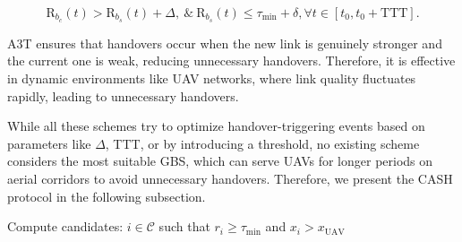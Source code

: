 \documentclass[10pt,conference]{IEEEtran}
\begin{document}
\begin{equation}
\label{a3teq}
\text{R}_{b_c}(t) > \text{R}_{b_s}(t) + \Delta, \: \text{\&} \: \text{R}_{b_s}(t) \leq \tau_{\min} + \delta,  \forall t \in [t_0, t_0 + \mathrm{TTT}].
\end{equation}

A3T ensures that handovers occur when the new link is genuinely stronger and the current one is weak, reducing unnecessary handovers. Therefore, it is effective in dynamic environments like UAV networks, where link quality fluctuates rapidly, leading to unnecessary handovers.

While all these schemes try to optimize handover-triggering events based on parameters like $\Delta$, TTT, or by introducing a threshold, no existing scheme considers the most suitable GBS, which can serve UAVs for longer periods on aerial corridors to avoid unnecessary handovers. Therefore, we present the CASH protocol in the following subsection.   



\begin{algorithm}[!t]
\small
\caption{CASH: Context-Aware Smart Handover}


Compute candidates: $i \in \mathcal{C}$ such that $r_i \geq \tau_{\min}$ and $x_i > x_{\text{UAV}}$\;


\end{algorithm}
\end{document}
